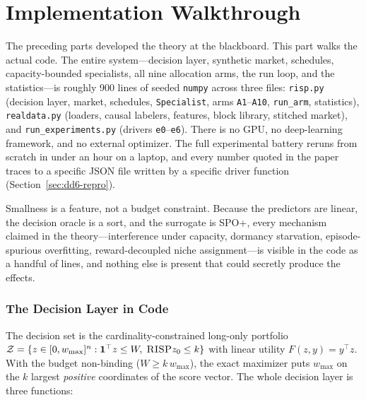 \documentclass[11pt,a4paper]{article}
\theoremstyle{definition}
\theoremstyle{plain}
\newcommand{\nm}{\textsc{RISP}}
\begin{document}
\part{Implementation Walkthrough}
\label{sec:dd6-part}

The preceding parts developed the theory at the blackboard. This part walks
the actual code. The entire system---decision layer, synthetic market,
schedules, capacity-bounded specialists, all nine allocation arms, the run
loop, and the statistics---is roughly 900 lines of seeded \texttt{numpy}
across three files: \texttt{risp.py} (decision layer, market, schedules,
\texttt{Specialist}, arms \texttt{A1}--\texttt{A10}, \texttt{run\_arm},
statistics), \texttt{realdata.py} (loaders, causal labelers, features, block
library, stitched market), and \texttt{run\_experiments.py} (drivers
\texttt{e0}--\texttt{e6}).
There is no GPU, no deep-learning framework, and no external optimizer. The
full experimental battery reruns from scratch in under an hour on a laptop,
and every number quoted in the paper traces to a specific JSON file written
by a specific driver function (Section~\ref{sec:dd6-repro}).

\begin{keypoint}
Smallness is a feature, not a budget constraint. Because the predictors are
linear, the decision oracle is a sort, and the surrogate is SPO+, every
mechanism claimed in the theory---interference under capacity, dormancy
starvation, episode-spurious overfitting, reward-decoupled niche
assignment---is visible in the code as a handful of lines, and nothing else
is present that could secretly produce the effects.
\end{keypoint}


\section{The Decision Layer in Code}
\label{sec:dd6-decision}

The decision set is the cardinality-constrained long-only portfolio
$\mathcal{Z} = \{ z \in [0, w_{\max}]^n : \mathbf{1}^\top z \le W,\;
\nm{z}_0 \le k \}$ with linear utility $F(z, y) = y^\top z$. With the budget
non-binding ($W \ge k\, w_{\max}$), the exact maximizer puts $w_{\max}$ on
the $k$ largest \emph{positive} coordinates of the score vector. The whole
decision layer is three functions:
\end{document}

